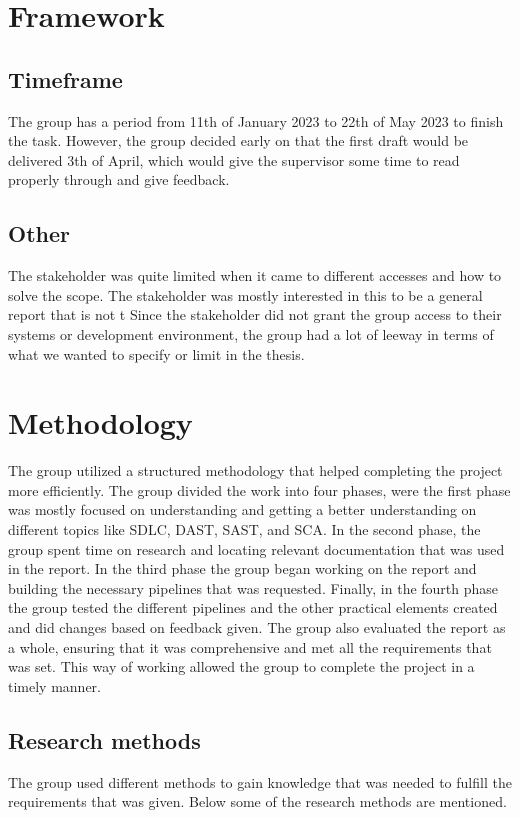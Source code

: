 \section{Framework}

\subsection{Timeframe}
The group has a period from 11th of January 2023 to 22th of May 2023 to finish the task. However, the group decided early on that the first draft would be delivered 3th of April, which would give the supervisor some time to read properly through and give feedback. 

\subsection{Other}
The stakeholder was quite limited when it came to different accesses and how to solve the scope. The stakeholder was mostly interested in this to be a general report that is not t
Since the stakeholder did not grant the group access to their systems or development environment, the group had a lot of leeway in terms of what we wanted to specify or limit in the thesis. 



\section{Methodology} %
The group utilized a structured methodology that helped completing the project more efficiently. The group divided the work into four phases, were the first phase was mostly focused on understanding and getting a better understanding on different topics like SDLC, DAST, SAST, and SCA. In the second phase, the group spent time on research and locating relevant documentation that was used in the report. In the third phase the group began working on the report and building the necessary pipelines that was requested. Finally, in the fourth phase the group tested the different pipelines and the other practical elements created and did changes based on feedback given. The group also evaluated the report as a whole, ensuring that it was comprehensive and met all the requirements that was set. This way of working allowed the group to complete the project in a timely manner. 
\newpage
\subsection{Research methods}
The group used different methods to gain knowledge that was needed to fulfill the requirements that was given. Below some of the research methods are mentioned. 

